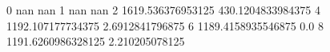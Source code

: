 0 nan nan
1 nan nan
2 1619.536376953125 430.1204833984375
4 1192.107177734375 2.6912841796875
6 1189.4158935546875 0.0
8 1191.6260986328125 2.210205078125
